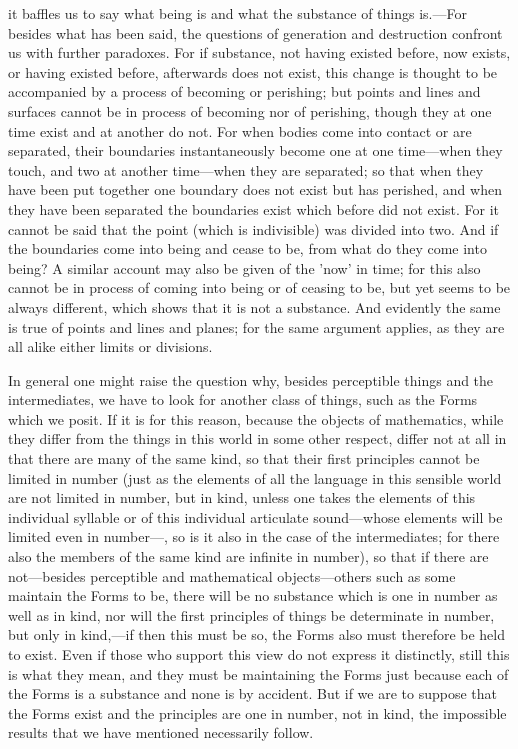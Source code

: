 it baffles us to say what being is and what the substance of things is.—For besides what has been said, the questions of generation and destruction confront us with further paradoxes. For if substance, not having existed before, now exists, or having existed before, afterwards does not exist, this change is thought to be accompanied by a process of becoming or perishing; but points and lines and surfaces cannot be in process of becoming nor of perishing, though they at one time exist and at another do not. For when bodies come into contact or are separated, their boundaries instantaneously become one at one time—when they touch, and two at another time—when they are separated; so that when they have been put together one boundary does not exist but has perished, and when they have been separated the boundaries exist which before did not exist. For it cannot be said that the point (which is indivisible) was divided into two. And if the boundaries come into being and cease to be, from what do they come into being? A similar account may also be given of the 'now' in time; for this also cannot be in process of coming into being or of ceasing to be, but yet seems to be always different, which shows that it is not a substance. And evidently the same is true of points and lines and planes; for the same argument applies, as they are all alike either limits or divisions.


In general one might raise the question why, besides perceptible things and the intermediates, we have to look for another class of things, such as the Forms which we posit. If it is for this reason, because the objects of mathematics, while they differ from the things in this world in some other respect, differ not at all in that there are many of the same kind, so that their first principles cannot be limited in number (just as the elements of all the language in this sensible world are not limited in number, but in kind, unless one takes the elements of this individual syllable or of this individual articulate sound—whose elements will be limited even in number—, so is it also in the case of the intermediates; for there also the members of the same kind are infinite in number), so that if there are not—besides perceptible and mathematical objects—others such as some maintain the Forms to be, there will be no substance which is one in number as well as in kind, nor will the first principles of things be determinate in number, but only in kind,—if then this must be so, the Forms also must therefore be held to exist. Even if those who support this view do not express it distinctly, still this is what they mean, and they must be maintaining the Forms just because each of the Forms is a substance and none is by accident. But if we are to suppose that the Forms exist and the principles are one in number, not in kind, the impossible results that we have mentioned necessarily follow.

